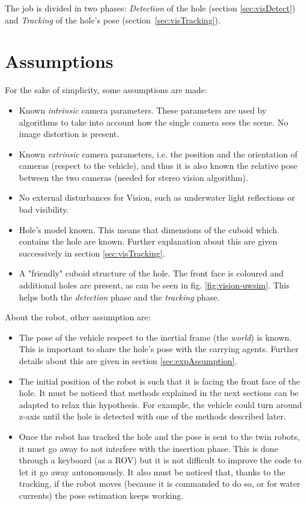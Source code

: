 \noindent The job is divided in two phases: \textit{Detection}  of the hole (section \ref{sec:visDetect}) and \textit{Tracking} of the hole's pose \mbox{(section \ref{sec:visTracking}).} 

\section{Assumptions}
\label{sec:visioAssumption} %
For the sake of simplicity, some assumptions are made:
\begin{itemize}
	\item Known \textit{intrinsic} camera parameters. These parameters are used by algorithms to take into account how the single camera sees the scene. No image distortion is present.
	\item Known \textit{extrinsic} camera parameters, i.e. the position and the orientation of cameras (respect to the vehicle), and thus it is also known the relative pose between the two cameras (needed for stereo vision algorithm).
	\item No external disturbances for Vision, such as underwater light reflections or bad visibility.
	\item Hole's model known. This means that dimensions of the cuboid which contains the hole are known. Further explanation about this are given successively in section \ref{sec:visTracking}.
	\item A "friendly" cuboid structure of the hole. The front face is coloured and additional holes are present, as can be seen in fig. \ref{fig:vision-uwsim}. This helps both the \textit{detection} phase and the \textit{tracking} phase.
\end{itemize}
About the robot, other assumption are:
\begin{itemize}
	\item The pose of the vehicle respect to the inertial frame (the \textit{world}) is known. This is important to share the hole's pose with the carrying agents. Further details about this are given in section \ref{sec:expAssumption}.
	
	\item The initial position of the robot is such that it is facing the front face of the hole. It must be noticed that methods explained in the next sections can be adapted to relax this hypothesis. For example, the vehicle could turn around z-axis until the hole is detected with one of the methods described later. 
	
	\item Once the robot has tracked the hole and the pose is sent to the twin robots, it must go away to not interfere with the insertion phase. This is done through a keyboard (as a ROV) but it is not difficult to improve the code to let it go away autonomously. It also must be noticed that, thanks to the tracking, if the robot moves (because it is commanded to do so, or for water currents) the pose estimation keeps working. 
\end{itemize}

